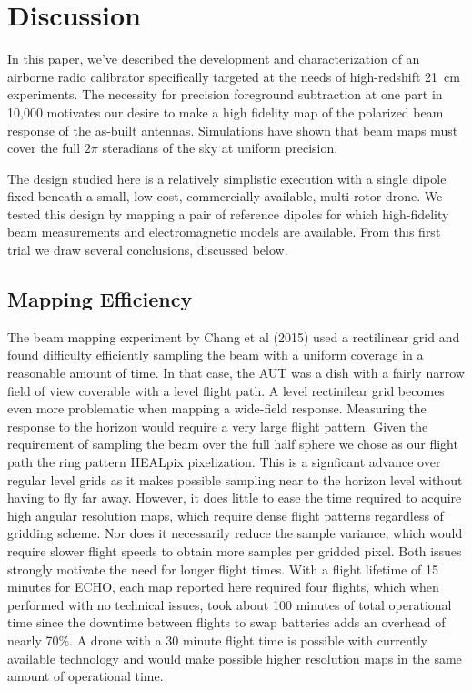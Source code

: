\documentclass[preprint2,numberedappendix,tighten,twocolappendix]{aastex6}
\begin{document}
\section{Discussion}
\label{sec:conclusion}

In this paper, we've described the development and characterization of an airborne radio calibrator specifically targeted at the needs of high-redshift 21~cm experiments. The necessity for precision foreground subtraction at one part in 10,000 motivates our desire to make a high fidelity map of the polarized beam response of the as-built antennas. Simulations have shown that beam maps must cover the full $2\pi$ steradians of the sky at uniform precision. 

The design studied here is a relatively simplistic execution with a single dipole fixed beneath a small, low-cost, commercially-available, multi-rotor drone.  We tested this design by mapping a pair of reference dipoles for which high-fidelity beam measurements and electromagnetic models are available.   From this first trial we draw several conclusions, discussed below.

\subsection{Mapping Efficiency}

The beam mapping experiment by Chang et al (2015) used a rectilinear grid and found difficulty efficiently sampling the beam with a uniform coverage in a reasonable amount of time.   In that case, the AUT was a dish with a fairly narrow field of view coverable with a level flight path. A level rectinilear grid becomes even more problematic when mapping a wide-field response.  Measuring the response to the horizon would require a very large flight pattern. Given the requirement of sampling the beam over the full half sphere we chose as our flight path the ring pattern HEALpix pixelization. This is a signficant advance over regular level grids as it makes possible sampling near to the horizon level without having to fly far away. However, it does little to ease the time required to acquire high angular resolution maps, which require dense flight patterns regardless of gridding scheme. Nor does it necessarily reduce the sample variance, which would require slower flight speeds to obtain more samples per gridded pixel. Both issues strongly motivate the need for longer flight times.  With a flight lifetime of 15 minutes for ECHO, each map reported here required four flights, which when performed with no technical issues, took about 100 minutes of total operational time since the downtime between flights to swap batteries adds an overhead of nearly 70\%.  A drone with a 30 minute flight time is possible with currently available technology and would make possible higher resolution maps in the same amount of operational time.
\end{document}
